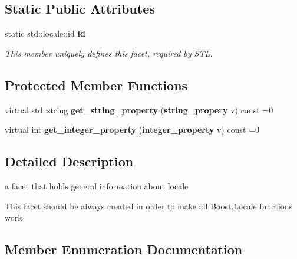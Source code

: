 \subsection*{Static Public Attributes}
\begin{DoxyCompactItemize}
\item 
static std\-::locale\-::id {\bf id}\label{classbooster_1_1locale_1_1info_aa3300572409ad20043a3ad629aa761df}

\begin{DoxyCompactList}\small\item\em This member uniquely defines this facet, required by S\-T\-L. \end{DoxyCompactList}\end{DoxyCompactItemize}
\subsection*{Protected Member Functions}
\begin{DoxyCompactItemize}
\item 
virtual std\-::string {\bf get\-\_\-string\-\_\-property} ({\bf string\-\_\-propery} v) const =0
\item 
virtual int {\bf get\-\_\-integer\-\_\-property} ({\bf integer\-\_\-property} v) const =0
\end{DoxyCompactItemize}


\subsection{Detailed Description}
a facet that holds general information about locale 

This facet should be always created in order to make all Boost.\-Locale functions work 

\subsection{Member Enumeration Documentation}
